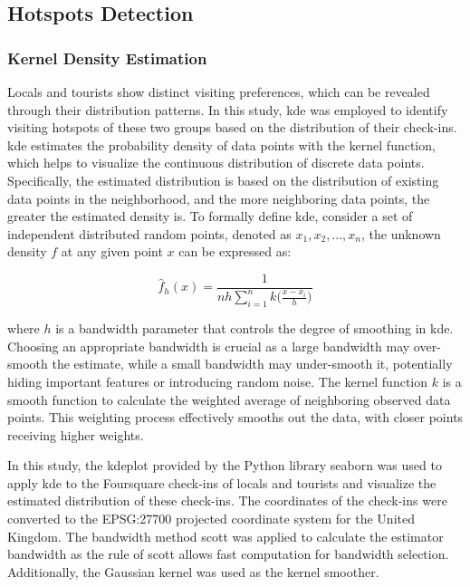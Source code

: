 \documentclass{article}
\theoremstyle{remark}
\begin{document}
\subsection{Hotspots Detection}\label{hotspots_detection}

\subsubsection{Kernel Density Estimation}
Locals and tourists show distinct visiting preferences, which can be revealed through their distribution patterns. In this study, \acrfull{kde} was employed to identify visiting hotspots of these two groups based on the distribution of their check-ins. \acrshort{kde} estimates the probability density of data points with the kernel function, which helps to visualize the continuous distribution of discrete data points. Specifically, the estimated distribution is based on the distribution of existing data points in the neighborhood, and the more neighboring data points, the greater the estimated density is. To formally define \acrshort{kde}, consider a set of independent distributed random points, denoted as $x_{1}, x_{2}, ..., x_{n}$, the unknown density $f$ at any given point $x$ can be expressed as:

\begin{equation} \label{eq:kde}
\hat{f}_{h}(x) = \frac{1}{nh \sum_{i=1}^n k\bigg(\frac{x-x_i}{h}\bigg)}
\end{equation}

where $h$ is a bandwidth parameter that controls the degree of smoothing in \acrshort{kde}. Choosing an appropriate bandwidth is crucial as a large bandwidth may over-smooth the estimate, while a small bandwidth may under-smooth it, potentially hiding important features or introducing random noise. The kernel function $k$ is a smooth function to calculate the weighted average of neighboring observed data points. This weighting process effectively smooths out the data, with closer points receiving higher weights.

In this study, the kdeplot provided by the Python library seaborn \citep{waskom_seaborn_2021} was used to apply \acrshort{kde} to the Foursquare check-ins of locals and tourists and visualize the estimated distribution of these check-ins. The coordinates of the check-ins were converted to the EPSG:27700 projected coordinate system for the United Kingdom. The bandwidth method scott was applied to calculate the estimator bandwidth as the rule of scott allows fast computation for bandwidth selection. Additionally, the Gaussian kernel was used as the kernel smoother.
\end{document}
